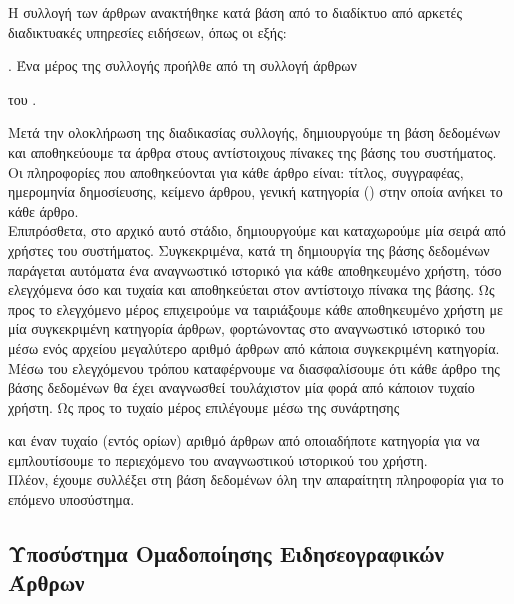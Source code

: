 {Η συλλογή των άρθρων ανακτήθηκε κατά βάση από το διαδίκτυο από αρκετές διαδικτυακές υπηρεσίες ειδήσεων, 
όπως οι εξής: {\textit {{}}. 
Ένα μέρος της συλλογής προήλθε από τη συλλογή άρθρων {\textit {{}} του {}.

Μετά την ολοκλήρωση της διαδικασίας συλλογής, 
δημιουργούμε τη βάση δεδομένων και αποθηκεύουμε τα άρθρα στους αντίστοιχους πίνακες της βάσης του συστήματος.
Οι πληροφορίες που αποθηκεύονται για κάθε άρθρο είναι: 
τίτλος, συγγραφέας, ημερομηνία δημοσίευσης, κείμενο άρθρου, γενική κατηγορία ({}) στην οποία ανήκει το κάθε άρθρο. \\
Επιπρόσθετα, στο αρχικό αυτό στάδιο, δημιουργούμε και καταχωρούμε μία σειρά από χρήστες του συστήματος. 
Συγκεκριμένα, κατά τη δημιουργία της βάσης δεδομένων παράγεται αυτόματα ένα αναγνωστικό ιστορικό για κάθε αποθηκευμένο χρήστη, 
τόσο ελεγχόμενα όσο και τυχαία και αποθηκεύεται στον αντίστοιχο πίνακα της βάσης. 
Ως προς το ελεγχόμενο μέρος επιχειρούμε να ταιριάξουμε κάθε αποθηκευμένο χρήστη με μία συγκεκριμένη κατηγορία άρθρων, 
φορτώνοντας στο αναγνωστικό ιστορικό του μέσω ενός αρχείου μεγαλύτερο αριθμό άρθρων από κάποια συγκεκριμένη κατηγορία. 
Μέσω του ελεγχόμενου τρόπου καταφέρνουμε να διασφαλίσουμε ότι κάθε άρθρο της βάσης δεδομένων θα έχει αναγνωσθεί 
τουλάχιστον μία φορά από κάποιον τυχαίο χρήστη.
Ως προς το τυχαίο μέρος επιλέγουμε μέσω της συνάρτησης { και έναν τυχαίο (εντός ορίων) αριθμό άρθρων από οποιαδήποτε κατηγορία 
για να εμπλουτίσουμε το περιεχόμενο του αναγνωστικού ιστορικού του χρήστη. \\

Πλέον, έχουμε συλλέξει στη βάση δεδομένων όλη την απαραίτητη πληροφορία για το επόμενο υποσύστημα.

\subsection{Υποσύστημα Ομαδοποίησης Ειδησεογραφικών Άρθρων}

}}}}
